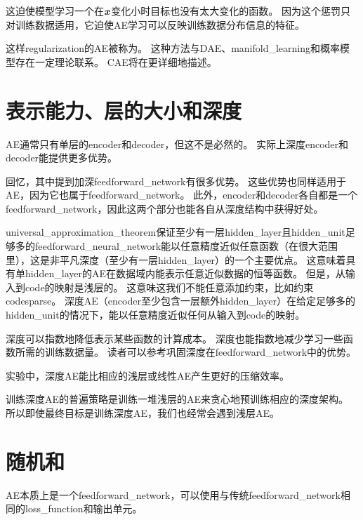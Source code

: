 这迫使模型学习一个在$\boldsymbol{\mathit{x}}$变化小时目标也没有太大变化的函数。
因为这个惩罚只对训练数据适用，它迫使\gls{AE}学习可以反映训练数据分布信息的特征。


这样\gls{regularization}的\gls{AE}被称为。
这种方法与\gls{DAE}、\gls{manifold_learning}和概率模型存在一定理论联系。
\gls{CAE}将在更详细地描述。


\section{表示能力、层的大小和深度}
\label{sec:representational_power_layer_size_and_depth}
\gls{AE}通常只有单层的\gls{encoder}和\gls{decoder}，但这不是必然的。
实际上深度\gls{encoder}和\gls{decoder}能提供更多优势。


回忆，其中提到加深\gls{feedforward_network}有很多优势。
这些优势也同样适用于\gls{AE}，因为它也属于\gls{feedforward_network}。
此外，\gls{encoder}和\gls{decoder}各自都是一个\gls{feedforward_network}，因此这两个部分也能各自从深度结构中获得好处。


\gls{universal_approximation_theorem}保证至少有一层\gls{hidden_layer}且\gls{hidden_unit}足够多的\gls{feedforward_neural_network}能以任意精度近似任意函数（在很大范围里），这是非平凡深度（至少有一层\gls{hidden_layer}）的一个主要优点。
这意味着具有单\gls{hidden_layer}的\gls{AE}在数据域内能表示任意近似数据的恒等函数。
但是，从输入到\gls{code}的映射是浅层的。
这意味这我们不能任意添加约束，比如约束\gls{code}\gls{sparse}。
深度\gls{AE}（\gls{encoder}至少包含一层额外\gls{hidden_layer}）在给定足够多的\gls{hidden_unit}的情况下，能以任意精度近似任何从输入到\gls{code}的映射。


深度可以指数地降低表示某些函数的计算成本。
深度也能指数地减少学习一些函数所需的训练数据量。
读者可以参考巩固深度在\gls{feedforward_network}中的优势。


实验中，深度\gls{AE}能比相应的浅层或线性\gls{AE}产生更好的压缩效率\citep{Hinton-Science2006}。

训练深度\gls{AE}的普遍策略是训练一堆浅层的\gls{AE}来贪心地预训练相应的深度架构。
所以即使最终目标是训练深度\gls{AE}，我们也经常会遇到浅层\gls{AE}。


\section{随机和}
\label{sec:stochastic_encoders_and_decoders}
\gls{AE}本质上是一个\gls{feedforward_network}，可以使用与传统\gls{feedforward_network}相同的\gls{loss_function}和输出单元。


